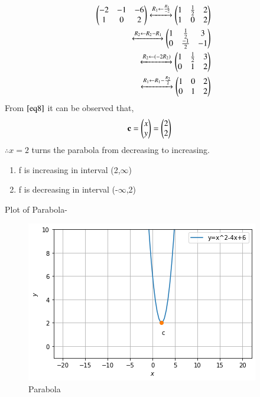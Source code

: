 \documentclass[journal,12pt,twocolumn]{IEEEtran}
\begin{document}
\begin{align}
\begin{pmatrix}-2 & -1 & -6\\1 & 0 & 2\end{pmatrix} 
\xleftrightarrow{R_1\leftarrow \frac{R_1}{-2}}\begin{pmatrix}1 & \frac{1}{2} & 2\\1 & 0 & 2\end{pmatrix} 
\\
\xleftrightarrow{R_2\leftarrow R_2 -R_1}\begin{pmatrix}1 & \frac{1}{2} & 3 \\0 & \frac{-1}{2} & -1\end{pmatrix}
\\
\xleftrightarrow{R_2\leftarrow (-2R_2)}\begin{pmatrix}1 & \frac{1}{2} & 3 \\0 & 1 & 2\end{pmatrix}
\\
\xleftrightarrow{R_1\leftarrow R_1 - \frac{R_2}{2}}\begin{pmatrix}1 & 0 & 2\\0 & 1 & 2\end{pmatrix}   \label{eq8}
\end{align}
From $\eqref{eq8}$ it can be observed that,
\begin{align}
\mathbf{c} &= \begin{pmatrix}x \\ y\end{pmatrix} = \begin{pmatrix}2 \\ 2\end{pmatrix}
\end{align}
$\therefore x=2$ turns the parabola from decreasing to increasing.
\begin{enumerate}
\item f is increasing in interval (2,$\infty$)
\item f is decreasing in interval (-$\infty$,2)
\end{enumerate}

Plot of Parabola-
\begin{figure}[ht]
    \centering
    \includegraphics[width=\columnwidth]{Figure.png}
    \caption{Parabola}
    \label{fig:Prarabola}
\end{figure}    
\end{document}
